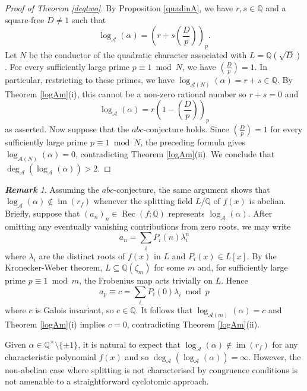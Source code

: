 \documentclass[12pt,reqno]{amsart}
\theoremstyle{remark}
\newtheorem{remark}[theorem]{\bf Remark}
\newcommand{\cA}{\mathcal A}
\newcommand{\leg}[2]{\left(\frac{#1}{#2}\right)}
\DeclareMathOperator{\Rec}{Rec}
\DeclareMathOperator{\im}{im}
\begin{document}
\begin{proof}[Proof of Theorem \ref{degtwo}]
By Proposition \ref{quadinA}, we have $r,s\in\mathbb{Q}$ and a square-free $D\neq 1$ such that
\[\log_\cA(\alpha)=\left(r+s\leg{D}{p}\right)_p.\]
Let $N$ be the conductor of the quadratic character associated with $L=\mathbb{Q}(\sqrt{D})$. 
For every sufficiently large prime $p\equiv 1\bmod N$, we have $\leg{D}{p}=1$. 
In particular, restricting to these primes, we have $\log_{\cA(N)}(\alpha)=r+s\in\mathbb{Q}$. 
By Theorem \ref{logAm}(i), this cannot be a non-zero rational number so $r+s=0$ and 
\[\log_\cA(\alpha)=r\left(1-\leg{D}{p}\right)_p\]
as asserted. 
Now suppose that the $abc$-conjecture holds. Since $\leg{D}{p}=1$ for every sufficiently large prime $p\equiv 1\bmod N$, the preceding formula gives $\log_{\cA(N)}(\alpha)=0$, contradicting Theorem \ref{logAm}(ii). We conclude that $\deg_\cA(\log_\cA(\alpha))>2$.
\end{proof}
\begin{remark}
Assuming the $abc$-conjecture, the same argument shows that $\log_\cA(\alpha)\not\in\im(r_f)$ whenever the splitting field $L/\mathbb{Q}$ of $f(x)$ is abelian. 
Briefly, suppose that $(a_n)_n\in\Rec(f;\mathbb{Q})$ represents $\log_\cA(\alpha)$. 
After omitting any eventually vanishing contributions from zero roots, we may write
\[a_n=\sum_i P_i(n)\lambda_i^n\]
where $\lambda_i$ are the distinct roots of $f(x)$ in $L$ and $P_i(x)\in L[x]$. 
By the Kronecker-Weber theorem, $L\subseteq\mathbb{Q}(\zeta_m)$ for some $m$ and, for sufficiently large prime $p\equiv 1\bmod m$, the Frobenius map acts trivially on $L$. Hence
\[a_p\equiv c=\sum_i P_i(0)\lambda_i\bmod p\]
where $c$ is Galois invariant, so $c\in\mathbb{Q}$. It follows that $\log_{\cA(m)}(\alpha)=c$ and Theorem \ref{logAm}(i) implies $c=0$, contradicting Theorem \ref{logAm}(ii). 

Given $\alpha\in\mathbb{Q}^\times\setminus\{\pm 1\}$, it is natural to expect that $\log_\cA(\alpha)\not\in\im(r_f)$ for any characteristic polynomial $f(x)$ and so $\deg_\cA(\log_\cA(\alpha))=\infty$. However, the non-abelian case where splitting is not characterised by congruence conditions is not amenable to a straightforward cyclotomic approach.
\end{remark}
\end{document}
